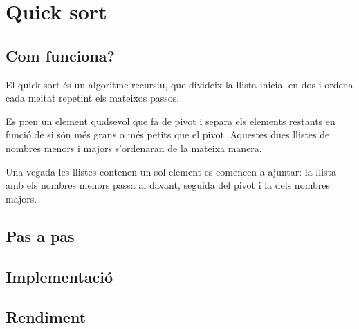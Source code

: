 \chapter{Quick sort}

\section{Com funciona?}
El quick sort és un algoritme recursiu, que divideix la llista inicial en dos i ordena cada meitat repetint els mateixos passos.

Es pren un element qualsevol que fa de pivot i separa els elements restants en funció de si són més grans o més petits que el pivot. Aquestes dues llistes de nombres menors i majors s'ordenaran de la mateixa manera.

Una vegada les llistes contenen un sol element es comencen a ajuntar: la llista amb els nombres menors passa al davant, seguida del pivot i la dels nombres majors.
\section{Pas a pas}

\section{Implementació}


\begin{minipage}{\textwidth}
	\section{Rendiment}
	\noindent
	\makebox[\textwidth][c]{
		
		}
	\vspace*{1em}
	\begin{center}
		
	\end{center}
\end{minipage}